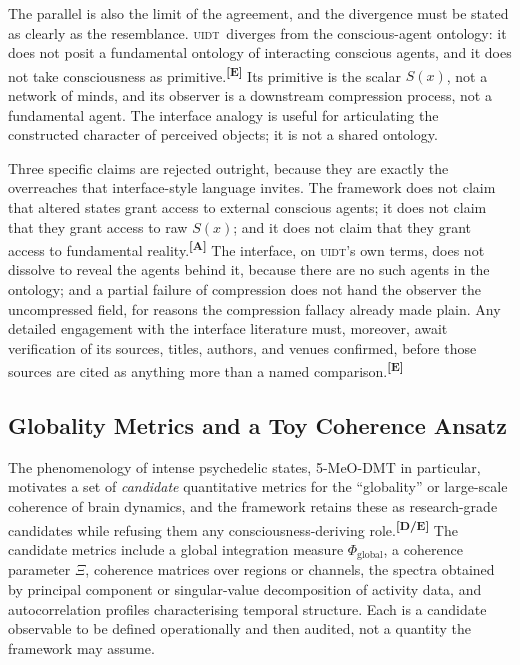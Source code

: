 \documentclass[12pt,a4paper,twoside]{article}
\theoremstyle{plain}
\theoremstyle{definition}
\theoremstyle{remark}
\newcommand{\UIDT}{\textsc{uidt}}
\newcommand{\catmark}[1]{\textsuperscript{\textsf{\textbf{[#1]}}}}
\begin{document}
The parallel is also the limit of the agreement, and the divergence must be stated as clearly as the resemblance. \UIDT\ diverges from the conscious-agent ontology: it does not posit a fundamental ontology of interacting conscious agents, and it does not take consciousness as primitive.\catmark{E} Its primitive is the scalar $S(x)$, not a network of minds, and its observer is a downstream compression process, not a fundamental agent. The interface analogy is useful for articulating the constructed character of perceived objects; it is not a shared ontology.

Three specific claims are rejected outright, because they are exactly the overreaches that interface-style language invites. The framework does not claim that altered states grant access to external conscious agents; it does not claim that they grant access to raw $S(x)$; and it does not claim that they grant access to fundamental reality.\catmark{A} The interface, on \UIDT's own terms, does not dissolve to reveal the agents behind it, because there are no such agents in the ontology; and a partial failure of compression does not hand the observer the uncompressed field, for reasons the compression fallacy already made plain. Any detailed engagement with the interface literature must, moreover, await verification of its sources, titles, authors, and venues confirmed, before those sources are cited as anything more than a named comparison.\catmark{E}

\subsection{Globality Metrics and a Toy Coherence Ansatz}
\label{subsec:globality-metrics}

The phenomenology of intense psychedelic states, 5-MeO-DMT in particular, motivates a set of \emph{candidate} quantitative metrics for the ``globality'' or large-scale coherence of brain dynamics, and the framework retains these as research-grade candidates while refusing them any consciousness-deriving role.\catmark{D/E} The candidate metrics include a global integration measure $\Phi_{\mathrm{global}}$, a coherence parameter $\Xi$, coherence matrices over regions or channels, the spectra obtained by principal component or singular-value decomposition of activity data, and autocorrelation profiles characterising temporal structure. Each is a candidate observable to be defined operationally and then audited, not a quantity the framework may assume.
\end{document}
